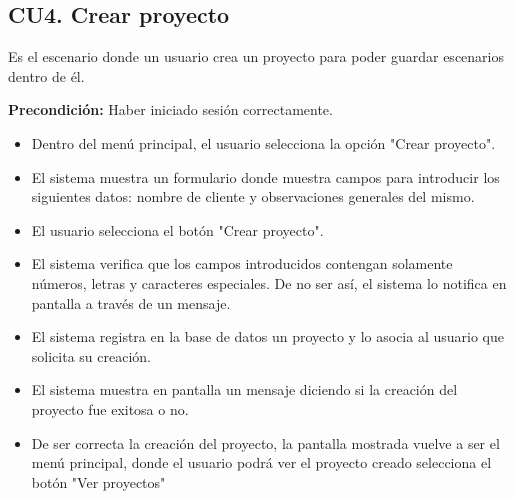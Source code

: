 \subsection{CU4. Crear proyecto}\par
Es el escenario donde un usuario crea un proyecto para poder guardar escenarios dentro de él.\par
\textbf{Precondición:} Haber iniciado sesión correctamente.\par
\begin{itemize}
	\item Dentro del menú principal, el usuario selecciona la opción "Crear proyecto".
	\item El sistema muestra un formulario donde muestra campos para introducir los siguientes datos: nombre de cliente y observaciones generales del mismo.
	\item El usuario selecciona el botón "Crear proyecto".
	\item El sistema verifica que los campos introducidos contengan solamente números, letras y caracteres especiales. De no ser así, el sistema lo notifica en pantalla a través de un mensaje.
	\item El sistema registra en la base de datos un proyecto y lo asocia al usuario que solicita su creación.
	\item El sistema muestra en pantalla un mensaje diciendo si la creación del proyecto fue exitosa o no.
	\item De ser correcta la creación del proyecto, la pantalla mostrada vuelve a ser el menú principal, donde el usuario podrá ver el proyecto creado selecciona el botón "Ver proyectos"
\end{itemize}

\newpage
